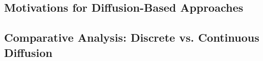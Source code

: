 \subsection{Motivations for Diffusion-Based Approaches}

\subsection{Comparative Analysis: Discrete vs. Continuous Diffusion}

